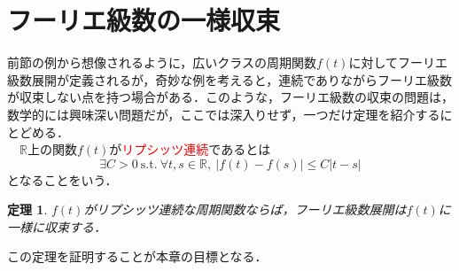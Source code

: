 \documentclass[a4j]{jsbook}
\newtheorem{theorem}{定理}
\numberwithin{theorem}{chapter}  %
\begin{document}
\section{フーリエ級数の一様収束} \label{sec1-5}
前節の例から想像されるように，広いクラスの周期関数\(f(t)\)に対してフーリエ級数展開が定義されるが，奇妙な例を考えると，連続でありながらフーリエ級数が収束しない点を持つ場合がある．このような，フーリエ級数の収束の問題は，数学的には興味深い問題だが，ここでは深入りせず，一つだけ定理を紹介するにとどめる．\\
　\(\mathbb{R}\)上の関数\(f(t)\)が\textcolor{red}{リプシッツ連続}であるとは
\begin{equation*}
    \exists C>0\ \mathrm{s.t.} \ \forall t, s\in\mathbb{R}, \ |f(t)-f(s)|\leq C|t-s|
\end{equation*}
となることをいう．
\begin{theorem}
\label{th1-3}
\(f(t)\)がリプシッツ連続な周期関数ならば，フーリエ級数展開は\(f(t)\)に一様に収束する．
\end{theorem}
この定理を証明することが本章の目標となる．
\end{document}
